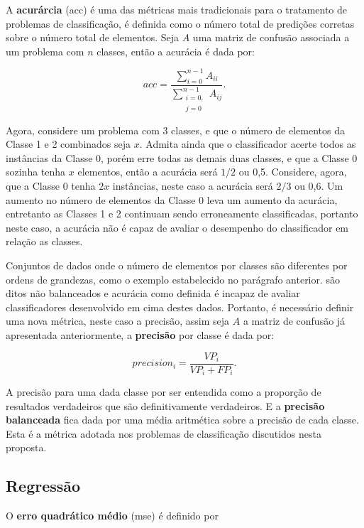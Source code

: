 A {\bf acurárcia} (acc) é uma das métricas mais tradicionais para o tratamento de problemas de classificação, é definida como o número total de predições corretas sobre o número total de elementos. Seja $A$ uma matriz de confusão associada a um problema com $n$ classes, então a acurácia é dada por:

\begin{equation}
acc=\frac{\sum_{i=0}^{n-1}A_{ii}}{\sum_{\substack{i=0,\\j=0}}^{n-1}A_{ij}}\mbox{.}
\end{equation}

Agora, considere um problema com 3 classes, e que o número de elementos da Classe 1 e 2 combinados seja $x$. Admita ainda que o classificador acerte todos as instâncias da Classe 0, porém erre todas as demais duas classes, e que a Classe 0 sozinha tenha $x$ elementos, então a acurácia será $1/2$ ou 0,5. Considere, agora, que a Classe 0 tenha $2x$ instâncias, neste caso a acurácia será $2/3$ ou 0,6. Um aumento no número de elementos da Classe 0 leva um aumento da acurácia, entretanto as Classes 1 e 2 continuam sendo erroneamente classificadas, portanto neste caso, a acurácia não é capaz de avaliar o desempenho do classificador em relação as classes.

Conjuntos de dados onde o número de elementos por classes são diferentes por ordens de grandezas, como o exemplo estabelecido no parágrafo anterior. são ditos não balanceados e acurácia como definida é incapaz de avaliar classificadores desenvolvido em cima destes dados. Portanto, é necessário definir uma nova métrica, neste caso a precisão, assim seja $A$ a matriz de confusão já apresentada anteriormente, a {\bf precisão} por classe é dada por:

\begin{equation}
precision_i=\frac{VP_i}{VP_i+FP_i}\mbox{.}
\end{equation}

A precisão para uma dada classe por ser entendida como a proporção de resultados verdadeiros que são definitivamente verdadeiros. E a {\bf precisão balanceada} fica dada por uma média aritmética sobre a precisão de cada classe. Esta é a métrica adotada nos problemas de classificação discutidos nesta proposta.

\subsection{Regressão}

O {\bf erro quadrático médio} (mse) é definido por

